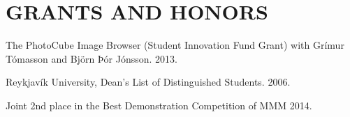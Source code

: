 \section{GRANTS AND HONORS}
The PhotoCube Image Browser (Student Innovation Fund Grant) with Grímur Tómasson and Björn Þór Jónsson. 2013.

Reykjavík University, Dean’s List of Distinguished Students. 2006.

Joint 2nd place in the Best Demonstration Competition of MMM 2014.

